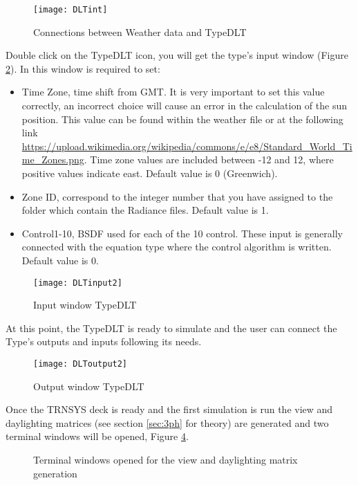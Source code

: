 \begin{figure}[h]
\centering
\texttt{[image: DLTint]}
\caption{\label{img5:DLTint} Connections between Weather data and TypeDLT}
\end{figure}


Double click on the TypeDLT icon, you will get the type's input window (Figure \ref{img5:DLTinput}). In this window is required to set:
\begin{itemize}
\renewcommand{\labelitemi}{\tiny$\blacksquare$}
\item Time Zone, time shift from GMT. It is very important to set this value correctly, an incorrect choice will cause an error in the calculation of the sun position. This value can be found within the weather file or at the following link \url{https://upload.wikimedia.org/wikipedia/commons/e/e8/Standard_World_Time_Zones.png}. Time zone values are included between -12 and 12, where positive values indicate east. Default value is 0 (Greenwich). 
\item Zone ID, correspond to the integer number that you have assigned to the folder which contain the Radiance files. Default value is 1.
\item Control1-10, BSDF used for each of the 10 control. These input is generally connected with the equation type where the control algorithm is written. Default value is 0.
\end{itemize} 


\begin{figure}[h]
\centering
\texttt{[image: DLTinput2]}
\caption{\label{img5:DLTinput} Input window TypeDLT }
\end{figure}


At this point, the TypeDLT is ready to simulate and the user can connect the Type's outputs and inputs following its needs.\\
\begin{figure}[h]
\centering
\texttt{[image: DLToutput2]}
\caption{\label{img5:DLToutput} Output window TypeDLT }
\end{figure}
Once the TRNSYS deck is ready and the first simulation is run the view and daylighting matrices (see section \ref{sec:3ph} for theory) are generated and two terminal windows will be opened, Figure \ref{img5:matrices}.

\begin{figure}[h] 
\centering
  \caption{\label{img5:matrices} Terminal windows opened for the view and daylighting matrix generation}
\end{figure}

